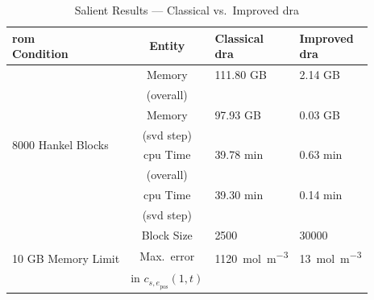 \begin{table}[!htbp]
	\centering
	\caption{Salient Results --- Classical vs.\ Improved \gls{dra} }
	\label{tbl:salientresults}
	\setlength{\extrarowheight}{1pt}
	\begin{tabular}{ @{} l c l l @{} }
		\toprule
		\makecell{\gls{rom} \\ Condition} & {Entity} & \makecell{Classical \\ \gls{dra} } & \makecell{Improved \\ \gls{dra}} \\
		\midrule
		\multirow{8}{1.22cm}{8000 Hankel Blocks} & Memory                         & 111.80 GB                        & 2.14 GB                        \\ [-5pt]
                                                 & \footnotesize (overall)        &                                  &                                \\
                                                 & Memory                         & 97.93 GB                         & 0.03 GB                        \\ [-5pt]
                                                 & \footnotesize(\gls{svd} step)  &                                  &                                \\
                                                 & \gls{cpu} Time                 & 39.78 min                        & 0.63 min                       \\ [-5pt]
                                                 & \footnotesize(overall)         &                                  &                                \\
                                                 & \gls{cpu} Time                 & 39.30 min                        & 0.14 min                       \\ [-5pt]
                                                 & \footnotesize(\gls{svd} step)  &                                  &                                \\ [2.5pt]
		\midrule
		\multirow{3}{1.22cm}{10 GB Memory Limit} & Block Size                     & 2500                             & 30000                          \\ [5pt]
                                                 & Max.\ error                    & \SI{1120}{\mole\per\meter\cubed} & \SI{13}{\mole\per\meter\cubed} \\ [-5pt]
                                                 & in $c_{{s,e}_\text{pos}}(1,t)$ &                                  &                                \\ [5pt]
		\bottomrule
	\end{tabular}
\end{table}

